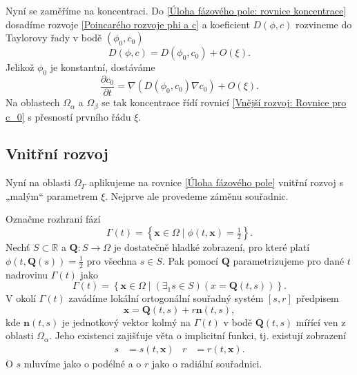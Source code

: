 Nyní se zaměříme na koncentraci.
Do \eqref{Úloha fázového pole: rovnice koncentrace} dosadíme rozvoje \eqref{Poincarého rozvoje phi a c} a koeficient \(D(\phi, c)\) rozvineme do Taylorovy řady v bodě \((\phi_0, c_0)\)
\begin{equation}
    D(\phi, c) = D(\phi_0, c_0) + O(\xi).
\end{equation}
Jelikož \(\phi_0\) je konstantní, dostáváme
\begin{equation}\label{Vnější rozvoj: Rovnice pro c_0}
    \frac{\partial c_0}{\partial t} = \nabla \left( D(\phi_0, c_0) \nabla c_0 \right)+ O(\xi).
\end{equation}
Na oblastech \(\Omega_\alpha\) a \(\Omega_\beta\) se tak koncentrace řídí rovnicí \eqref{Vnější rozvoj: Rovnice pro c_0} s přesností prvního řádu \(\xi\).

\subsection{Vnitřní rozvoj}
Nyní na oblasti \(\Omega_\Gamma\) aplikujeme na rovnice \eqref{Úloha fázového pole} vnitřní rozvoj s „malým“ parametrem \(\xi\).
Nejprve ale provedeme záměnu souřadnic.

Označme rozhraní fází
\begin{equation}
    \Gamma(t) = \left\{\mathbf{x} \in \Omega \mid \phi(t, \mathbf{x}) = \tfrac{1}{2}\right\}.
\end{equation}
Nechť \(S \subset \mathbb{R}\) a \(\mathbf{Q}:S \to \Omega\) je dostatečně hladké zobrazení, pro které platí \(\phi(t, \mathbf{Q}(s)) = \tfrac{1}{2}\) pro všechna \(s\in S\).
Pak pomocí \(\mathbf{Q}\) parametrizujeme pro dané \(t\) nadrovinu \(\Gamma(t)\) jako
\begin{equation}
    \Gamma(t) = \left\{\mathbf{x} \in \Omega \mid \left(\exists_1 s \in S\right) \left(x = \mathbf{Q}(t, s)\right)\right\}.
\end{equation}
V okolí \(\Gamma(t)\) zavádíme lokální ortogonální souřadný systém \([s, r]\) předpisem
\begin{equation}
    \mathbf{x} = \mathbf{Q}(t, s) + r \mathbf{n}(t, s),
\end{equation}
kde \(\mathbf{n}(t, s)\) je jednotkový vektor kolmý na \(\Gamma(t)\) v bodě \(\mathbf{Q}(t, s)\) mířící ven z oblasti \(\Omega_\alpha\).
Jeho existenci zajišťuje věta o implicitní funkci, tj. existují zobrazení
\begin{align}
    s &= s(t, \mathbf{x})& r &= r(t, \mathbf{x}).
\end{align}
O \(s\) mluvíme jako o podélné a o \(r\) jako o radiální souřadnici.

